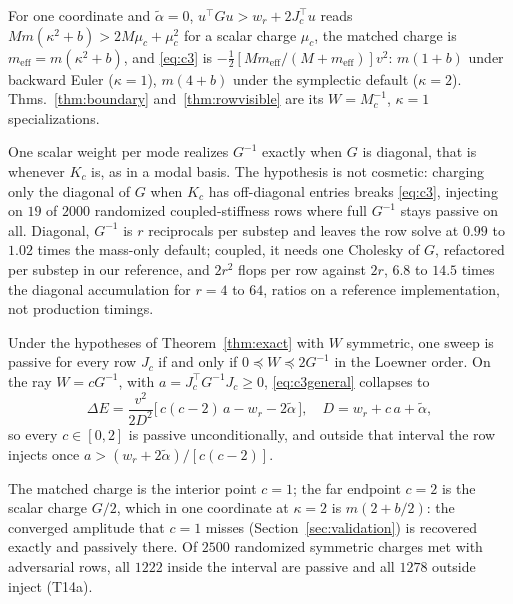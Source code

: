 \documentclass[sigconf,screen,review,anonymous]{acmart}
\newcommand{\Rr}{w_{r}}
\newcommand{\meff}{m_{\mathrm{eff}}}
\theoremstyle{acmdefinition}
\begin{document}
For one coordinate and $\tilde\alpha = 0$, $u^{\top} G u > \Rr +
2 J_c^{\top} u$ reads
$M m(\kappa^2 + b) > 2 M \mu_c + \mu_c^2$ for a scalar charge $\mu_c$, the
matched charge is $\meff = m(\kappa^2 + b)$, and \eqref{eq:c3} is
$-\tfrac12[M\meff/(M+\meff)]v^2$: $m(1 + b)$ under backward Euler
($\kappa = 1$), $m(4 + b)$ under the symplectic default
($\kappa = 2$). Thms.~\ref{thm:boundary} and~\ref{thm:rowvisible} are its
$W = M_c^{-1}$, $\kappa = 1$ specializations.

One scalar weight per mode realizes $G^{-1}$ exactly when $G$ is diagonal, that
is whenever $K_c$ is, as in a modal basis. The hypothesis is not cosmetic:
charging only the diagonal of $G$ when
$K_c$ has off-diagonal entries breaks \eqref{eq:c3}, injecting on $19$ of $2000$
randomized coupled-stiffness rows where full $G^{-1}$ stays passive on all.
Diagonal, $G^{-1}$ is $r$
reciprocals per substep and leaves the row solve at $0.99$ to $1.02$ times the
mass-only default; coupled, it needs one Cholesky of $G$, refactored per substep in our reference, and $2r^{2}$ flops per row
against $2r$, $6.8$ to $14.5$ times the diagonal accumulation for $r = 4$ to
$64$, ratios on a reference implementation, not production timings.

\begin{corollary}
\label{cor:family}
Under the hypotheses of Theorem~\ref{thm:exact} with $W$ symmetric, one sweep is
passive for every row $J_c$ if and only if $0 \preceq W \preceq 2G^{-1}$ in the
Loewner order.
On the ray $W = cG^{-1}$, with $a = J_c^{\top} G^{-1} J_c \ge 0$,
\eqref{eq:c3general} collapses to
\begin{equation}
\Delta E = \frac{v^2}{2D^2}\big[\,c(c-2)\,a - \Rr - 2\tilde\alpha\,\big],
\quad D = \Rr + c\,a + \tilde\alpha,
\label{eq:family}
\end{equation}
so every $c \in [0,2]$ is passive unconditionally, and outside that interval the
row injects once $a > (\Rr + 2\tilde\alpha)/[c(c-2)]$.
\end{corollary}

The matched charge is the interior point $c = 1$; the far
endpoint $c = 2$ is the scalar charge $G/2$, which in one coordinate at
$\kappa = 2$ is $m(2 + b/2)$: the converged amplitude that $c = 1$ misses
(Section~\ref{sec:validation}) is recovered exactly and passively there. Of $2500$ randomized symmetric charges
met with adversarial rows, all $1222$ inside the interval are
passive and all $1278$ outside inject (T14a).
\end{document}
